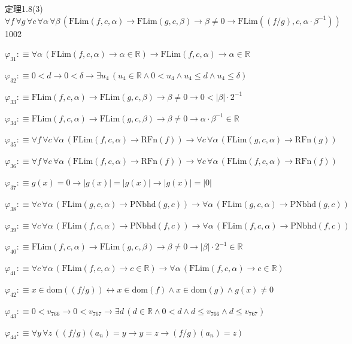 \begin{fullproof}{定理1.8(3)}{$\forall f\,\forall g\,\forall c\,\forall \alpha\,\forall \beta\,(\mathrm{FLim}(f,c,\alpha) \to \mathrm{FLim}(g,c,\beta) \to \beta \neq 0 \to \mathrm{FLim}((f / g),c,\alpha \cdot \beta^{-1}))$}{1002}
\begin{abbrevlist}
\item $\varphi_{31} :\equiv \forall \alpha\,(\mathrm{FLim}(f,c,\alpha) \to \alpha \in \mathbb{R}) \to \mathrm{FLim}(f,c,\alpha) \to \alpha \in \mathbb{R}$
\item $\varphi_{32} :\equiv 0 < d \to 0 < \delta \to \exists u_{4}\,(u_{4} \in \mathbb{R} \land 0 < u_{4} \land u_{4} \leq d \land u_{4} \leq \delta)$
\item $\varphi_{33} :\equiv \mathrm{FLim}(f,c,\alpha) \to \mathrm{FLim}(g,c,\beta) \to \beta \neq 0 \to 0 < \lvert \beta \rvert \cdot 2^{-1}$
\item $\varphi_{34} :\equiv \mathrm{FLim}(f,c,\alpha) \to \mathrm{FLim}(g,c,\beta) \to \beta \neq 0 \to \alpha \cdot \beta^{-1} \in \mathbb{R}$
\item $\varphi_{35} :\equiv \forall f\,\forall c\,\forall \alpha\,(\mathrm{FLim}(f,c,\alpha) \to \mathrm{RFn}(f)) \to \forall c\,\forall \alpha\,(\mathrm{FLim}(g,c,\alpha) \to \mathrm{RFn}(g))$
\item $\varphi_{36} :\equiv \forall f\,\forall c\,\forall \alpha\,(\mathrm{FLim}(f,c,\alpha) \to \mathrm{RFn}(f)) \to \forall c\,\forall \alpha\,(\mathrm{FLim}(f,c,\alpha) \to \mathrm{RFn}(f))$
\item $\varphi_{37} :\equiv g(x) = 0 \to \lvert g(x) \rvert = \lvert g(x) \rvert \to \lvert g(x) \rvert = \lvert 0 \rvert$
\item $\varphi_{38} :\equiv \forall c\,\forall \alpha\,(\mathrm{FLim}(g,c,\alpha) \to \mathrm{PNbhd}(g,c)) \to \forall \alpha\,(\mathrm{FLim}(g,c,\alpha) \to \mathrm{PNbhd}(g,c))$
\item $\varphi_{39} :\equiv \forall c\,\forall \alpha\,(\mathrm{FLim}(f,c,\alpha) \to \mathrm{PNbhd}(f,c)) \to \forall \alpha\,(\mathrm{FLim}(f,c,\alpha) \to \mathrm{PNbhd}(f,c))$
\item $\varphi_{40} :\equiv \mathrm{FLim}(f,c,\alpha) \to \mathrm{FLim}(g,c,\beta) \to \beta \neq 0 \to \lvert \beta \rvert \cdot 2^{-1} \in \mathbb{R}$
\item $\varphi_{41} :\equiv \forall c\,\forall \alpha\,(\mathrm{FLim}(f,c,\alpha) \to c \in \mathbb{R}) \to \forall \alpha\,(\mathrm{FLim}(f,c,\alpha) \to c \in \mathbb{R})$
\item $\varphi_{42} :\equiv x \in \mathrm{dom}((f / g)) \leftrightarrow x \in \mathrm{dom}(f) \land x \in \mathrm{dom}(g) \land g(x) \neq 0$
\item $\varphi_{43} :\equiv 0 < v_{766} \to 0 < v_{767} \to \exists d\,(d \in \mathbb{R} \land 0 < d \land d \leq v_{766} \land d \leq v_{767})$
\item $\varphi_{44} :\equiv \forall y\,\forall z\,((f / g)(a_{n}) = y \to y = z \to (f / g)(a_{n}) = z)$

\end{abbrevlist}
\end{fullproof}
